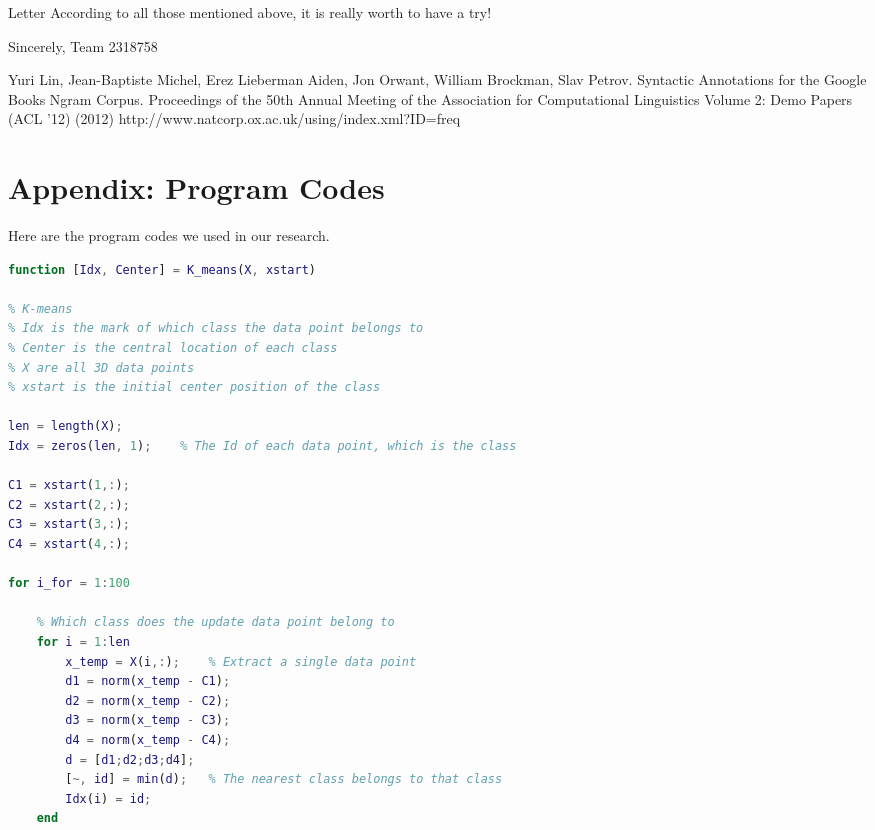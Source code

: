 \documentclass[12pt]{article}  %
\begin{document}
\begin{letter}{Letter}
According to all those mentioned above, it is really worth to have a try! 

\begin{flushright}

Sincerely, Team 2318758
\end{flushright}

\end{letter}





\begin{subappendices}  %
\begin{thebibliography}{99}  
Yuri Lin, Jean-Baptiste Michel, Erez Lieberman Aiden, Jon Orwant, William Brockman, Slav Petrov. Syntactic Annotations for the Google Books Ngram Corpus. Proceedings of the 50th Annual Meeting of the Association for Computational Linguistics Volume 2: Demo Papers (ACL '12) (2012)
http://www.natcorp.ox.ac.uk/using/index.xml?ID=freq

\end{thebibliography}


\clearpage

\section{Appendix: Program Codes}
Here are the program codes we used in our research.


\begin{lstlisting}[language=MATLAB, name={K_means.m}]
function [Idx, Center] = K_means(X, xstart)

% K-means
% Idx is the mark of which class the data point belongs to
% Center is the central location of each class
% X are all 3D data points
% xstart is the initial center position of the class

len = length(X);        
Idx = zeros(len, 1);    % The Id of each data point, which is the class

C1 = xstart(1,:);       
C2 = xstart(2,:);       
C3 = xstart(3,:);       
C4 = xstart(4,:);      

for i_for = 1:100
    
    % Which class does the update data point belong to
    for i = 1:len
        x_temp = X(i,:);    % Extract a single data point
        d1 = norm(x_temp - C1);    
        d2 = norm(x_temp - C2);    
        d3 = norm(x_temp - C3);    
        d4 = norm(x_temp - C4);    
        d = [d1;d2;d3;d4];
        [~, id] = min(d);   % The nearest class belongs to that class
        Idx(i) = id;
    end
    

\end{lstlisting}
\end{subappendices}
\end{document}
